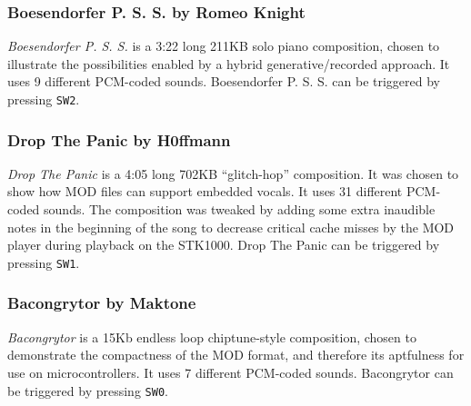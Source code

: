 \subsubsection{Boesendorfer P. S. S. by Romeo Knight}
\emph{Boesendorfer P. S. S.} is a 3:22 long 211KB solo piano composition, chosen to illustrate the possibilities enabled by a hybrid generative/recorded approach.
It uses 9 different PCM-coded sounds.
Boesendorfer P. S. S. can be triggered by pressing \texttt{SW2}.

\subsubsection{Drop The Panic by H0ffmann}
\emph{Drop The Panic} is a 4:05 long 702KB ``glitch-hop'' composition.
It was chosen to show how MOD files can support embedded vocals.
It uses 31 different PCM-coded sounds.
The composition was tweaked by adding some extra inaudible notes in the beginning of the song to decrease critical cache misses by the MOD player during playback on the STK1000.
Drop The Panic can be triggered by pressing \texttt{SW1}.

\subsubsection{Bacongrytor by Maktone}
\emph{Bacongrytor} is a 15Kb endless loop chiptune-style composition, chosen to demonstrate the compactness of the MOD format, and therefore its aptfulness for use on microcontrollers.
It uses 7 different PCM-coded sounds.
Bacongrytor can be triggered by pressing \texttt{SW0}.
